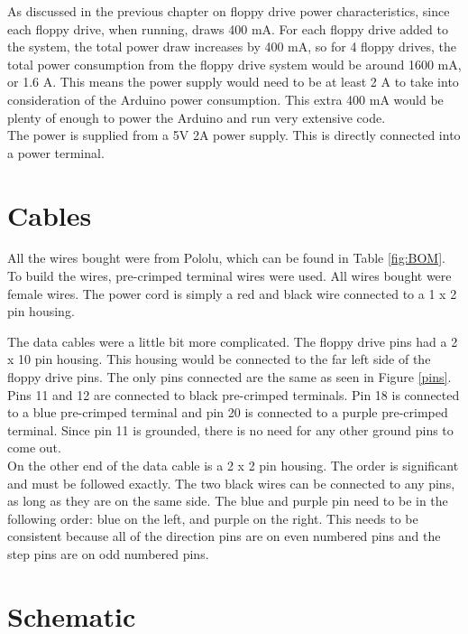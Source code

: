 \documentclass[11pt, a4paper]{report}
\begin{document}
As discussed in the previous chapter on floppy drive power characteristics, since each floppy drive, when running, draws 400 mA. For each floppy drive added to the system, the total power draw increases by 400 mA, so for 4 floppy drives, the total power consumption from the floppy drive system would be around 1600 mA, or 1.6 A. This means the power supply would need to be at least 2 A to take into consideration of the Arduino power consumption. This extra 400 mA would be plenty of enough to power the Arduino and run very extensive code. \\

The power is supplied from a 5V 2A power supply. This is directly connected into a power terminal. \\
  
\section{Cables}
All the wires bought were from Pololu, which can be found in Table \ref{fig:BOM}. \\

To build the wires, pre-crimped terminal wires were used. All wires bought were female wires. The power cord is simply a red and black wire connected to a 1 x 2 pin housing. 

The data cables were a little bit more complicated. The floppy drive pins had a 2 x 10 pin housing. This housing would be connected to the far left side of the floppy drive pins. The only pins connected are the same as seen in Figure \ref{pins}. Pins 11 and 12 are connected to black pre-crimped terminals. Pin 18 is connected to a blue pre-crimped terminal and pin 20 is connected to a purple pre-crimped terminal. Since pin 11 is grounded, there is no need for any other ground pins to come out. \\

On the other end of the data cable is a 2 x 2 pin housing. The order is significant and must be followed exactly. The two black wires can be connected to any pins, as long as they are on the same side. The blue and purple pin need to be in the following order: blue on the left, and purple on the right. This needs to be consistent because all of the direction pins are on even numbered pins and the step pins are on odd numbered pins. \\

\section{Schematic}
\end{document}
